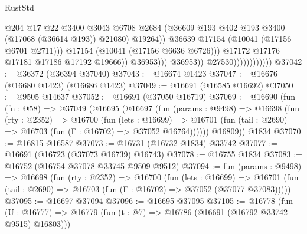 \begin{lexlean}{RustStd}
\begin{coremodule}
                                                  @204
                                                  @17
                                                  @22
                                                  @3400
                                                  @3043
                                                  @6708
                                                  @2684
                                                  (@36609
                                                    @193
                                                    @402
                                                    @193
                                                    @3400
                                                    (@17068 (@36614 @193))
                                                    @21080)
                                                  @19264))
                                              @36639
                                              @17154
                                              (@10041 (@17156 @6701 @2711)))
                                            @17154
                                            (@10041 (@17156 @6636 @6726)))
                                          @17172
                                          @17176
                                          @17181
                                          @17186
                                          @17192
                                          @19666))
                                      @36953)))
                                @36953))
                            @27530))))))))))))
@37042 := @36372 (@36394 @37040)
@37043 := @16674 @1423
@37047 := @16676 (@16680 @1423) (@16686 @1423)
@37049 := @16691 (@16585 @16692)
@37050 := @9505 @14637
@37052 := @16691 (@37050 @16719)
@37069 := @16690
    (fun (fn : @58) =>
    @37049
      (@16695
        (@16697
          (fun (params : @9498) =>
          @16698
            (fun (rty : @2352) =>
            @16700
              (fun (lets : @16699) =>
              @16701 (fun (tail : @2690) => @16703 (fun (Γ : @16702) => @37052 @16764))))))
        @16809))
    @1834
@37070 := @16815 @16587
@37073 := @16731 (@16732 @1834) @33742
@37077 := @16691 (@16723 (@37073 @16739) @16743)
@37078 := @16755 @1834
@37083 := @16752 (@16754 @37078 @33745 @9509 @9512)
@37094 := fun (params : @9498) =>
  @16698
    (fun (rty : @2352) =>
    @16700
      (fun (lets : @16699) =>
      @16701 (fun (tail : @2690) => @16703 (fun (Γ : @16702) => @37052 (@37077 @37083)))))
@37095 := @16697 @37094
@37096 := @16695 @37095
@37105 := @16778
    (fun (U : @16777) => @16779 (fun (t : @7) => @16786 (@16691 (@16792 @33742 @9515) @16803)))

\end{coremodule}
\end{lexlean}
